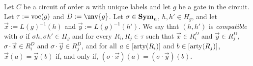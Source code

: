 \documentclass[../paper.tex]{subfiles}
\begin{document}






\begin{definition}
  Let $C$ be a circuit of order $n$ with unique labels and let $g$ be a gate in
  the circuit. Let $\tau := \text{voc}(g)$ and $D := \unv{g}$. Let $\sigma \in
  \text{\textbf{Sym}}_n$, $h, h' \in H_g$, and let $\vec{x} := L(g)^{-1}(h)$ and $\vec{y} :=
  L(g)^{-1}(h')$. We say that $(h, h')$ is \emph{compatible} with $\sigma$ if
  $\sigma h, \sigma h' \in H_g$ and for every $R_i, R_j\in \tau$ such that $\vec{x} \in R^{D}_i$ and $\vec{y} \in R^{D}_j$,
  $\sigma \cdot \vec{x} \in R^{D}_i$ and $\sigma \cdot \vec{y} \in R^D_j$, and
  for all $a \in [\mathrm{arty}(R_i)]$ and $b \in [\mathrm{arty}(R_j)]$, $\vec{x}(a) =
  \vec{y}(b)$ if, and only if, $(\sigma \cdot \vec{x})(a) = (\sigma \cdot
  \vec{y})(b)$.
\end{definition}
\end{document}
